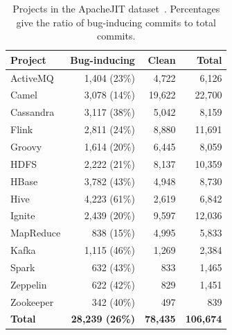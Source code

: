 \documentclass[final,5p,times,twocolumn]{elsarticle}
\theoremstyle{plain}
\begin{document}
\begin{table}[t]
\centering
\caption{Projects in the ApacheJIT dataset~\cite{keshavarz2022apachejit}.
Percentages give the ratio of bug-inducing commits to total commits.}
\label{tab:projects}
\small
\begin{tabular}{lrrr}
\toprule
Project & Bug-inducing & Clean & Total \\
\midrule
ActiveMQ  & 1{,}404 (23\%) & 4{,}722  & 6{,}126 \\
Camel     & 3{,}078 (14\%) & 19{,}622 & 22{,}700 \\
Cassandra & 3{,}117 (38\%) & 5{,}042  & 8{,}159 \\
Flink     & 2{,}811 (24\%) & 8{,}880  & 11{,}691 \\
Groovy    & 1{,}614 (20\%) & 6{,}445  & 8{,}059 \\
HDFS      & 2{,}222 (21\%) & 8{,}137  & 10{,}359 \\
HBase     & 3{,}782 (43\%) & 4{,}948  & 8{,}730 \\
Hive      & 4{,}223 (61\%) & 2{,}619  & 6{,}842 \\
Ignite    & 2{,}439 (20\%) & 9{,}597  & 12{,}036 \\
MapReduce & 838 (15\%)     & 4{,}995  & 5{,}833 \\
Kafka     & 1{,}115 (46\%) & 1{,}269  & 2{,}384 \\
Spark     & 632 (43\%)     & 833      & 1{,}465 \\
Zeppelin  & 622 (42\%)     & 829      & 1{,}451 \\
Zookeeper & 342 (40\%)     & 497      & 839 \\
\midrule
\textbf{Total} & \textbf{28{,}239 (26\%)} & \textbf{78{,}435} & \textbf{106{,}674} \\
\bottomrule
\end{tabular}
\end{table}

\end{document}

